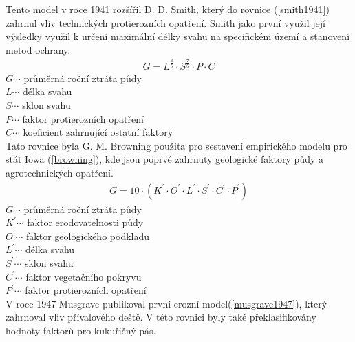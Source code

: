 Tento model v roce 1941 rozšířil D. D. Smith, který do rovnice
(\ref{smith1941}) zahrnul vliv technických protierozních
opatření. Smith jako první využil její výsledky využil k určení
maximální délky svahu na specifickém území a stanovení metod
ochrany.\cite{Smith1941}
\begin{align}
   \label{smith1941} G=L^{\frac{3}{5}}\cdot S^{\frac{7}{5}}\cdot P\cdot C
\end{align}
\hspace*{2cm}$G \cdots$ průměrná roční ztráta půdy\\
\hspace*{2cm}$L \cdots$ délka svahu \\
\hspace*{2cm}$S \cdots$ sklon svahu \\
\hspace*{2cm}$P \cdots$ faktor protierozních opatření \\
\hspace*{2cm}$C \cdots$ koeficient zahrnující ostatní faktory \\

Tato rovnice byla G. M. Browning použita pro sestavení empirického
modelu pro stát Iowa (\ref{browning}), kde jsou poprvé zahrnuty
geologické faktory půdy a agrotechnických opatření.\cite{browning1947}
\begin{align}
   \label{browning} G=10\cdot\left( K^{\prime}\cdot O^{\prime}\cdot  L^{\prime}\cdot S^{\prime}\cdot C^{\prime}\cdot P^{\prime} \right)
\end{align}
\hspace*{2cm}$G \cdots$ průměrná roční ztráta půdy\\
\hspace*{2cm}$K^{\prime} \cdots$ faktor erodovatelnosti půdy \\
\hspace*{2cm}$O^{\prime} \cdots$ faktor geologického podkladu \\
\hspace*{2cm}$L^{\prime} \cdots$ délka svahu \\
\hspace*{2cm}$S^{\prime} \cdots$ sklon svahu \\
\hspace*{2cm}$C^{\prime} \cdots$ faktor vegetačního pokryvu \\
\hspace*{2cm}$P^{\prime} \cdots$ faktor protierozních opatření \\

V roce 1947 Musgrave publikoval první erozní
model(\ref{musgrave1947}), který zahrnoval vliv přívalového deště. V
této rovnici byly také překlasifikovány hodnoty faktorů pro kukuřičný
pás.\cite{MUSGRAVE1947}

